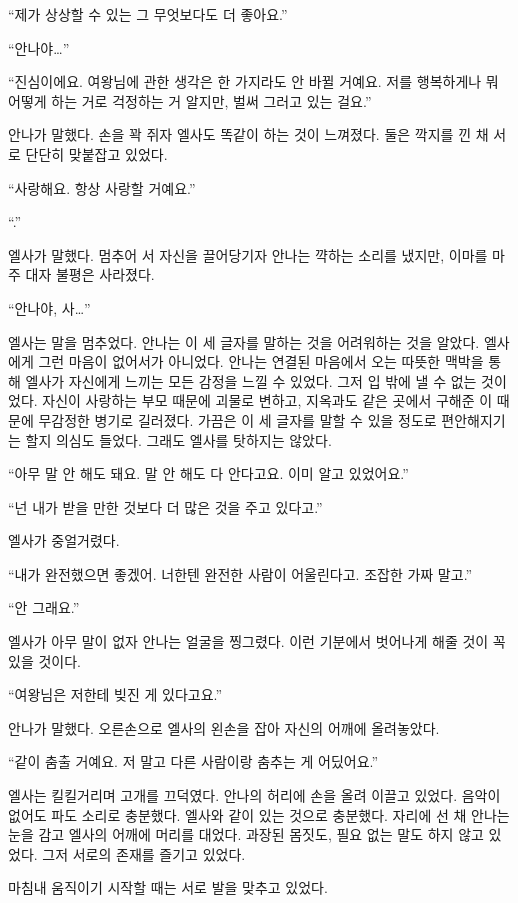 ``제가 상상할 수 있는 그 무엇보다도 더 좋아요.''

``안나야\ldots''

``진심이에요. 여왕님에 관한 생각은 한 가지라도 안 바뀔 거예요. 저를 행복하게나 뭐 어떻게 하는 거로 걱정하는 거 알지만, 벌써 그러고 있는 걸요.''

안나가 말했다. 손을 꽉 쥐자 엘사도 똑같이 하는 것이 느껴졌다. 둘은 깍지를 낀 채 서로 단단히 맞붙잡고 있었다.

``사랑해요. 항상 사랑할 거예요.''

``.''

엘사가 말했다. 멈추어 서 자신을 끌어당기자 안나는 꺅하는 소리를 냈지만, 이마를 마주 대자 불평은 사라졌다.

``안나야, 사\ldots''

엘사는 말을 멈추었다. 안나는 이 세 글자를 말하는 것을 어려워하는 것을 알았다. 엘사에게 그런 마음이 없어서가 아니었다. 안나는 연결된 마음에서 오는 따뜻한 맥박을 통해 엘사가 자신에게 느끼는 모든 감정을 느낄 수 있었다. 그저 입 밖에 낼 수 없는 것이었다. 자신이 사랑하는 부모 때문에 괴물로 변하고, 지옥과도 같은 곳에서 구해준 이 때문에 무감정한 병기로 길러졌다. 가끔은 이 세 글자를 말할 수 있을 정도로 편안해지기는 할지 의심도 들었다. 그래도 엘사를 탓하지는 않았다.

``아무 말 안 해도 돼요. 말 안 해도 다 안다고요. 이미 알고 있었어요.''

``넌 내가 받을 만한 것보다 더 많은 것을 주고 있다고.''

엘사가 중얼거렸다.

``내가 완전했으면 좋겠어. 너한텐 완전한 사람이 어울린다고. 조잡한 가짜 말고.''

``안 그래요.''

엘사가 아무 말이 없자 안나는 얼굴을 찡그렸다. 이런 기분에서 벗어나게 해줄 것이 꼭 있을 것이다.

``여왕님은 저한테 빚진 게 있다고요.''

안나가 말했다. 오른손으로 엘사의 왼손을 잡아 자신의 어깨에 올려놓았다.

``같이 춤출 거예요. 저 말고 다른 사람이랑 춤추는 게 어딨어요.''

엘사는 킬킬거리며 고개를 끄덕였다. 안나의 허리에 손을 올려 이끌고 있었다. 음악이 없어도 파도 소리로 충분했다. 엘사와 같이 있는 것으로 충분했다. 자리에 선 채 안나는 눈을 감고 엘사의 어깨에 머리를 대었다. 과장된 몸짓도, 필요 없는 말도 하지 않고 있었다. 그저 서로의 존재를 즐기고 있었다.

마침내 움직이기 시작할 때는 서로 발을 맞추고 있었다.

